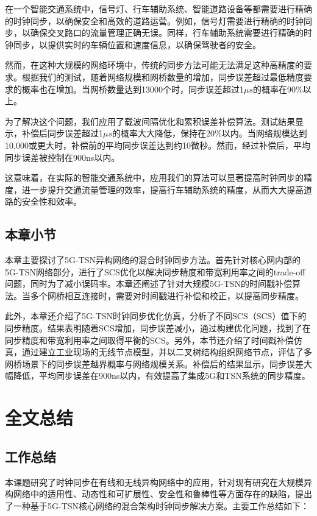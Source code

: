 \documentclass[UTF8,a4paper,12pt]{ctexart}
\numberwithin{equation}{section}
\begin{document}
在一个智能交通系统中，信号灯、行车辅助系统、智能道路设备等都需要进行精确的时钟同步，以确保安全和高效的道路运营。例如，信号灯需要进行精确的时钟同步，以确保交叉路口的流量管理正确无误。同样，行车辅助系统需要进行精确的时钟同步，以提供实时的车辆位置和速度信息，以确保驾驶者的安全。

然而，在这种大规模的网络环境中，传统的同步方法可能无法满足这种高精度的要求。根据我们的测试，随着网络规模和网桥数量的增加，同步误差超过最低精度要求的概率也在增加。当网桥数量达到13000个时，同步误差超过1$\mu s$的概率在90\%以上。

为了解决这个问题，我们应用了载波间隔优化和累积误差补偿算法。测试结果显示，补偿后同步误差超过1$\mu s$的概率大大降低，保持在20\%以内。当网络规模达到10,000或更大时，补偿前的平均同步误差达到约10微秒。然而，经过补偿后，平均同步误差被控制在900ns以内。

这意味着，在实际的智能交通系统中，应用我们的算法可以显著提高时钟同步的精度，进一步提升交通流量管理的效率，提高行车辅助系统的精度，从而大大提高道路的安全性和效率。


\subsection{本章小节}
本章主要探讨了5G-TSN异构网络的混合时钟同步方法。首先针对核心网内部的5G-TSN网络部分，进行了SCS优化以解决同步精度和带宽利用率之间的trade-off问题，同时为了减小误码率。本章还阐述了针对大规模5G-TSN的时间戳补偿算法。当多个网桥相互连接时，需要对时间戳进行补偿和校正，以提高同步精度。

此外，本章还介绍了5G-TSN时钟同步优化仿真，分析了不同SCS（SCS）值下的同步精度。结果表明随着SCS增加，同步误差减小，通过构建优化问题，找到了在同步精度和带宽利用率之间取得平衡的SCS。另外，本节还介绍了时间戳补偿仿真，通过建立工业现场的无线节点模型，并以二叉树结构组织网络节点，评估了多网桥场景下的同步误差越界概率与网络规模关系。补偿后的结果显示，同步误差大幅降低，平均同步误差在900ns以内，有效提高了集成5G和TSN系统的同步精度。



\newpage
{}
\section{全文总结}

\subsection{工作总结}
本课题研究了时钟同步在有线和无线异构网络中的应用，针对现有研究在大规模异构网络中的适用性、动态性和可扩展性、安全性和鲁棒性等方面存在的缺陷，提出了一种基于5G-TSN核心网络的混合架构时钟同步解决方案。主要工作总结如下：
\end{document}
